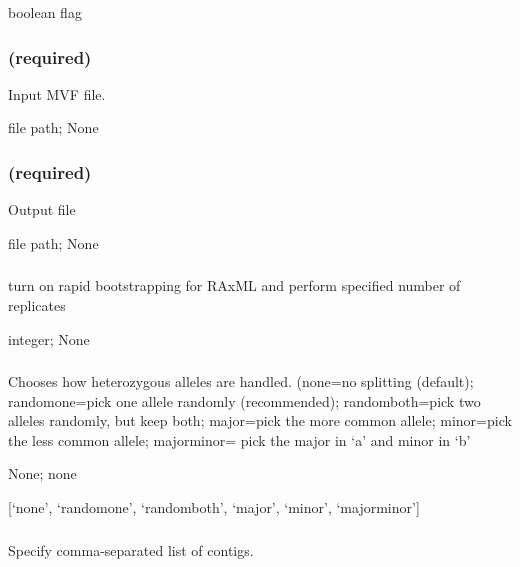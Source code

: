 \documentclass[letterpaper,11pt,english]{sphinxmanual}
\begin{document}
 boolean flag


\subsubsection{ (required)}
\label{\detokenize{prog_desc:id102}}
 Input MVF file.

 file path;  None


\subsubsection{ (required)}
\label{\detokenize{prog_desc:id103}}
 Output file

 file path;  None


\subsubsection{}
\label{\detokenize{prog_desc:bootstrap}}
 turn on rapid bootstrapping for RAxML and perform specified number of replicates

 integer;  None


\subsubsection{}
\label{\detokenize{prog_desc:choose-allele-chooseallele-hapmode}}
 Chooses how heterozygous alleles are handled. (none=no splitting (default); randomone=pick one allele randomly (recommended); randomboth=pick two alleles randomly, but keep both; major=pick the more common allele; minor=pick the less common allele; majorminor= pick the major in ‘a’ and minor in ‘b’

 None;  none

 {[}‘none’, ‘randomone’, ‘randomboth’, ‘major’, ‘minor’, ‘majorminor’{]}


\subsubsection{}
\label{\detokenize{prog_desc:id104}}
 Specify comma-separated list of contigs.
\end{document}
